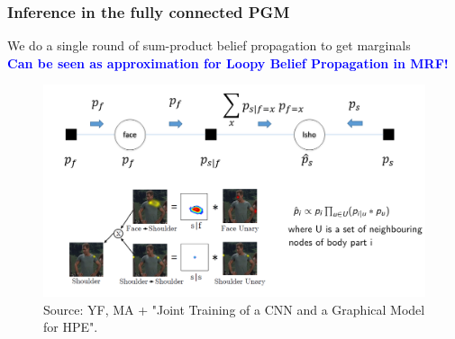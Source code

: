 \documentclass{beamer}
\newcommand\blue[1]{\textcolor{blue}{\textbf{#1}}}
\begin{document}
	\begin{frame}[t]
        \frametitle{Inference in the fully connected PGM}
        \begin{center}
        	We do a single round of sum-product belief propagation to get marginals \\
        	\blue{Can be seen as approximation for Loopy Belief Propagation in MRF!}
            \begin{figure}[htbp] %
            \includegraphics[scale=0.29]{inference.png} \\
            \scriptsize Source: YF, MA + "Joint Training of a CNN and a Graphical Model for HPE".
            \end{figure}
        \end{center}
    \end{frame}
    
    
    
\end{document}
